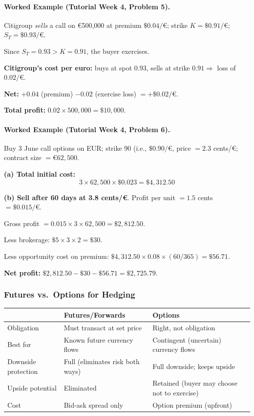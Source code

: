 \documentclass[11pt,a4paper]{article}
\begin{document}
\paragraph{Worked Example (Tutorial Week 4, Problem 5).}
Citigroup \textit{sells} a call on €500{,}000 at premium $\$0.04/\text{€}$; strike $K = \$0.91/\text{€}$; $S_T = \$0.93/\text{€}$.

Since $S_T = 0.93 > K = 0.91$, the buyer exercises.

\textbf{Citigroup's cost per euro:} buys at spot $0.93$, sells at strike $0.91 \Rightarrow$ loss of $0.02/\text{€}$.

\textbf{Net:} $+0.04$ (premium) $- 0.02$ (exercise loss) $= +\$0.02/\text{€}$.

\textbf{Total profit:} $0.02 \times 500{,}000 = \$10{,}000$.

\paragraph{Worked Example (Tutorial Week 4, Problem 6).}

Buy 3 June call options on EUR; strike 90 (i.e., $\$0.90/\text{€}$, price $= 2.3$ cents/€; contract size $= €62{,}500$.

\textbf{(a) Total initial cost:}
\[
  3 \times 62{,}500 \times \$0.023 = \$4{,}312.50
\]

\textbf{(b) Sell after 60 days at 3.8 cents/€}. Profit per unit $= 1.5$ cents $= \$0.015/\text{€}$.

Gross profit $= 0.015 \times 3 \times 62{,}500 = \$2{,}812.50$.

Less brokerage: $\$5 \times 3 \times 2 = \$30$.

Less opportunity cost on premium: $\$4{,}312.50 \times 0.08 \times (60/365) = \$56.71$.

\textbf{Net profit:} $\$2{,}812.50 - \$30 - \$56.71 = \$2{,}725.79$.

\subsubsection{Futures vs.\ Options for Hedging}

\begin{center}
\begin{tabular}{lp{5cm}p{5cm}}
\toprule
 & \textbf{Futures/Forwards} & \textbf{Options} \\
\midrule
Obligation & Must transact at set price & Right, not obligation \\
Best for & Known future currency flows & Contingent (uncertain) currency flows \\
Downside protection & Full (eliminates risk both ways) & Full downside; keeps upside \\
Upside potential & Eliminated & Retained (buyer may choose not to exercise) \\
Cost & Bid-ask spread only & Option premium (upfront) \\
\bottomrule
\end{tabular}
\end{center}
\end{document}
